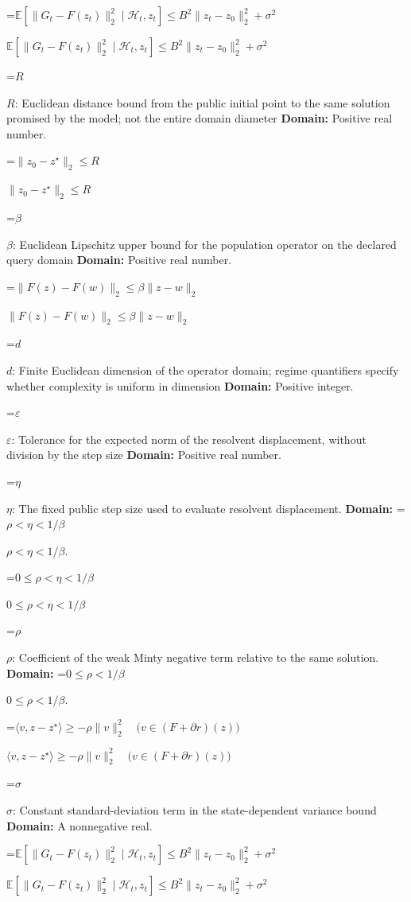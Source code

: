 \documentclass[10pt,a4paper]{article}
\newcommand{\AtlasMath}[1]{\par\begingroup\centering\setbox0=\hbox{$\displaystyle #1$}\ifdim\wd0>1.4\linewidth\typeout{ATLAS WIDE FORMULA: \the\wd0}\fi\ifdim\wd0>\linewidth\resizebox{\linewidth}{!}{\box0}\else\box0\fi\par\endgroup}
\newcommand{\AtlasInlineMath}[1]{\begingroup\setbox0=\hbox{$#1$}\ifdim\wd0>.4\linewidth\endgroup\AtlasMath{#1}\else\endgroup$#1$\fi}
\begin{document}
\AtlasInlineMath{\mathbb E[\|G_t-F(z_t)\|_2^2\mid\mathcal H_t,z_t]\le B^2\|z_t-z_0\|_2^2+\sigma^2}



\AtlasInlineMath{R}: Euclidean distance bound from the public initial point to the same solution promised by the model; not the entire domain diameter \textbf{Domain:} Positive real number.



\AtlasInlineMath{\|z_0-z^\star\|_2\le R}



\AtlasInlineMath{\beta}: Euclidean Lipschitz upper bound for the population operator on the declared query domain \textbf{Domain:} Positive real number.



\AtlasInlineMath{\|F(z)-F(w)\|_2\le\beta\|z-w\|_2}



\AtlasInlineMath{d}: Finite Euclidean dimension of the operator domain; regime quantifiers specify whether complexity is uniform in dimension \textbf{Domain:} Positive integer.



\AtlasInlineMath{\varepsilon}: Tolerance for the expected norm of the resolvent displacement, without division by the step size \textbf{Domain:} Positive real number.



\AtlasInlineMath{\eta}: The fixed public step size used to evaluate resolvent displacement. \textbf{Domain:} \AtlasInlineMath{\rho<\eta<1/\beta}.



\AtlasInlineMath{0\le\rho<\eta<1/\beta}



\AtlasInlineMath{\rho}: Coefficient of the weak Minty negative term relative to the same solution. \textbf{Domain:} \AtlasInlineMath{0\le\rho<1/\beta}.



\AtlasInlineMath{\langle v,z-z^\star\rangle\ge-\rho\|v\|_2^2\quad\bigl(v\in(F+\partial r)(z)\bigr)}



\AtlasInlineMath{\sigma}: Constant standard-deviation term in the state-dependent variance bound \textbf{Domain:} A nonnegative real.



\AtlasInlineMath{\mathbb E[\|G_t-F(z_t)\|_2^2\mid\mathcal H_t,z_t]\le B^2\|z_t-z_0\|_2^2+\sigma^2}
\end{document}
